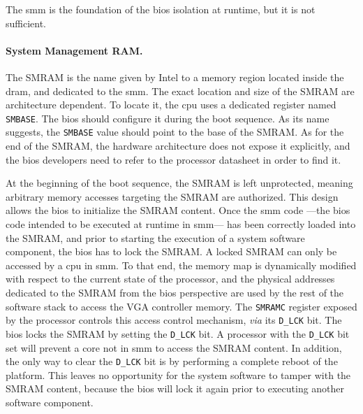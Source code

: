The \ac{smm} is the foundation of the \ac{bios} isolation at runtime, but it is
not sufficient.

\paragraph{System Management RAM.}
%
The SMRAM is the name given by Intel to a memory region located inside the
\ac{dram}, and dedicated to the \ac{smm}.
%
The exact location and size of the SMRAM are architecture dependent.
%
To locate it, the \ac{cpu} uses a dedicated register named \texttt{SMBASE}.
%
The \ac{bios} should configure it during the boot sequence.
%
As its name suggests, the \texttt{SMBASE} value should point to the base of the
SMRAM.
%
As for the end of the SMRAM, the hardware architecture does not expose it
explicitly, and the \ac{bios} developers need to refer to the processor
datasheet in order to find it.

At the beginning of the boot sequence, the SMRAM is left unprotected, meaning
arbitrary memory accesses targeting the SMRAM are authorized.
%
This design allows the \ac{bios} to initialize the SMRAM content.
%
Once the \ac{smm} code ---the \ac{bios} code intended to be executed at runtime
in \ac{smm}--- has been correctly loaded into the SMRAM, and prior to starting
the execution of a system software component, the \ac{bios} has to lock the
SMRAM.
%
A locked SMRAM can only be accessed by a \ac{cpu} in \ac{smm}.
%
To that end, the memory map is dynamically modified with respect to the current
state of the processor, and the physical addresses dedicated to the SMRAM from
the \ac{bios} perspective are used by the rest of the software stack to access
the VGA controller memory.
%
%
The \texttt{SMRAMC} register exposed by the processor controls this access
control mechanism, \emph{via} its \texttt{D\_LCK} bit.
%
The \ac{bios} locks the SMRAM by setting the \texttt{D\_LCK} bit.
%
A processor with the \texttt{D\_LCK} bit set will prevent a core not in \ac{smm}
to access the SMRAM content.
%
In addition, the only way to clear the \texttt{D\_LCK} bit is by performing a
complete reboot of the platform.
%
This leaves no opportunity for the system software to tamper with the SMRAM
content, because the \ac{bios} will lock it again prior to executing another
software component.

